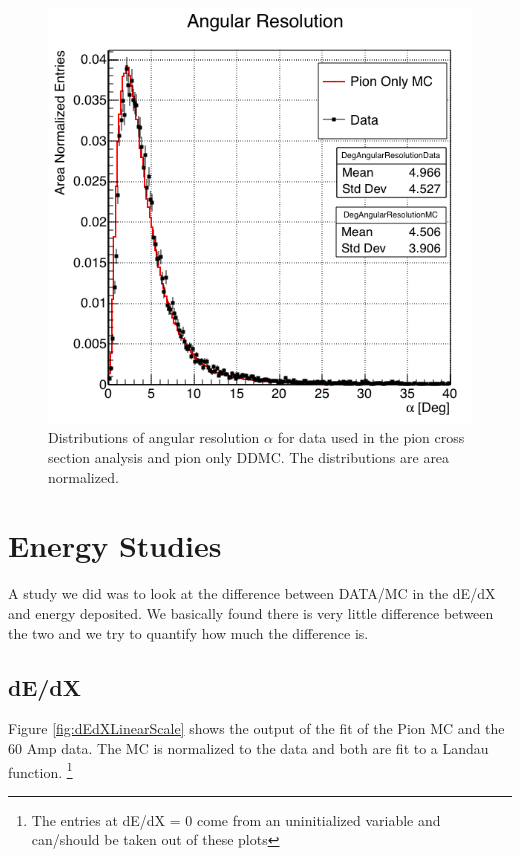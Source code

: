 \begin{figure}[ht]
\begin{minipage}[t]{0.45\linewidth}
\includegraphics[width=\textwidth]{Studies/Figures/cTrackingDeg.png}
\caption[]{Distributions of angular resolution $\alpha$ for data used in the pion cross section analysis and pion only DDMC. The distributions are area normalized. } \label{fig:trackingResolution}
\end{minipage}
\end{figure}


\section{Energy Studies}

A study we did was to look at the difference between DATA/MC in the dE/dX and energy deposited. We basically found there is very little difference between the two and we try to quantify how much the difference is.

\subsection{dE/dX}
Figure \ref{fig:dEdXLinearScale} shows the output of the fit of the Pion MC and the 60 Amp data. The MC is normalized to the data and both are fit to a Landau function. \footnote{The entries at dE/dX = 0 come from an uninitialized variable and can/should be taken out of these plots}

